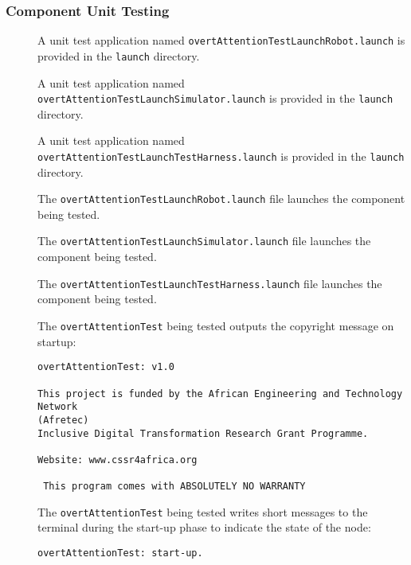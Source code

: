 \documentclass{CSSRforAfrica}
\newcommand{\checkboxChecked}{\fbox{\ding{51}}} %
\newcommand{\checkboxDashed}{\fbox{--}}         %
\begin{document}
\subsubsection{Component Unit Testing}
\label{subsubsection:overt_attention_test_unit_testing}


\begin{description}
\item[\checkboxChecked] A unit test application named {\small \verb+overtAttentionTestLaunchRobot.launch+} is provided in the {\small \verb+launch+} directory. 

\item[\checkboxChecked] A unit test application named {\small \verb+overtAttentionTestLaunchSimulator.launch+} is provided in the {\small \verb+launch+} directory. 

\item[\checkboxChecked] A unit test application named {\small \verb+overtAttentionTestLaunchTestHarness.launch+} is provided in the {\small \verb+launch+} directory. 

\item[\checkboxChecked] The {\small \verb+overtAttentionTestLaunchRobot.launch+} file  launches the component being tested.

\item[\checkboxDashed] The {\small \verb+overtAttentionTestLaunchSimulator.launch+} file  launches the component being tested.

\item[\checkboxChecked] The {\small \verb+overtAttentionTestLaunchTestHarness.launch+} file  launches the component being tested.

\item[\checkboxChecked]  The {\small \verb+overtAttentionTest+} being tested outputs the copyright message on startup:
\begin{verbatim}
overtAttentionTest: v1.0
 
This project is funded by the African Engineering and Technology Network 
(Afretec) 
Inclusive Digital Transformation Research Grant Programme.
 
Website: www.cssr4africa.org
 
 This program comes with ABSOLUTELY NO WARRANTY
\end{verbatim}

\item[\checkboxChecked]  The {\small \verb+overtAttentionTest+} being tested writes short messages to the terminal during the start-up phase to
 indicate the state of the node:
\begin{verbatim}
overtAttentionTest: start-up.
\end{verbatim}


\end{description}
\end{document}
